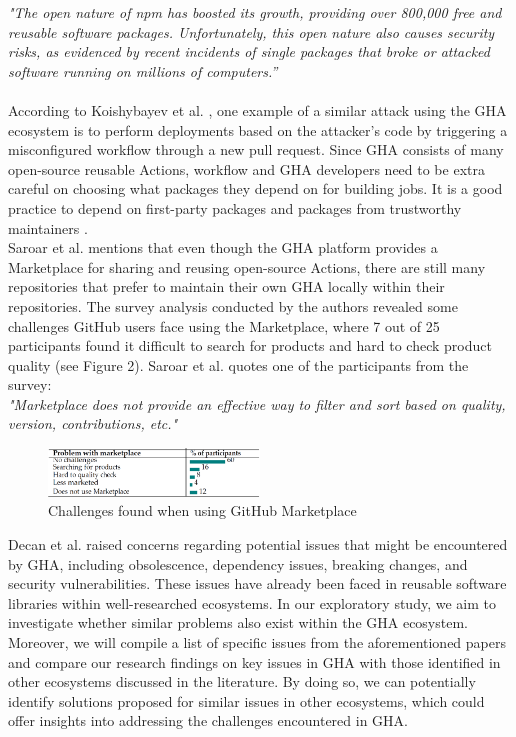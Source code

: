 \documentclass[conference]{IEEEtran}
\begin{document}
        \textit{"The open nature of npm has boosted its growth, providing over 800,000 free and reusable software packages. Unfortunately, this open nature also causes security risks, as evidenced by recent incidents of single packages that broke or attacked software running on millions of computers.”} \\\\
According to Koishybayev et al. \cite{koishybayev2022characterizing}, one example of a similar attack using the GHA ecosystem is to perform deployments based on the attacker’s code by triggering a misconfigured workflow through a new pull request. Since GHA consists of many open-source reusable Actions, workflow and GHA developers need to be extra careful on choosing what packages they depend on for building jobs. It is a good practice to depend on first-party packages and packages from trustworthy maintainers \cite{zimmermann2019small}. \\


        Saroar et al. \cite{saroar2023developers} mentions that even though the GHA platform provides a Marketplace for sharing and reusing open-source Actions, there are still many repositories that prefer to maintain their own GHA locally within their repositories. The survey analysis conducted by the authors revealed some challenges GitHub users face using the Marketplace, where 7 out of 25 participants found it difficult to search for products and hard to check product quality (see Figure 2). Saroar et al. \cite{saroar2023developers} quotes one of the participants from the survey: \\


\textit{"Marketplace does not provide an effective way to filter and sort based on quality, version, contributions, etc."}\\

\begin{figure} [H]
\includegraphics[width=0.5\textwidth]{Table 1.png}
\caption{Challenges found when using GitHub Marketplace \cite{saroar2023developers} }
\end{figure}

	Decan et al. \cite{decan2022use} raised concerns regarding potential issues that might be encountered by GHA, including obsolescence, dependency issues, breaking changes, and security vulnerabilities. These issues have already been faced in reusable software libraries within well-researched ecosystems. In our exploratory study, we aim to investigate whether similar problems also exist within the GHA ecosystem. Moreover, we will compile a list of specific issues from the aforementioned papers and compare our research findings on key issues in GHA with those identified in other ecosystems discussed in the literature. By doing so, we can potentially identify solutions proposed for similar issues in other ecosystems, which could offer insights into addressing the challenges encountered in GHA.
\end{document}
